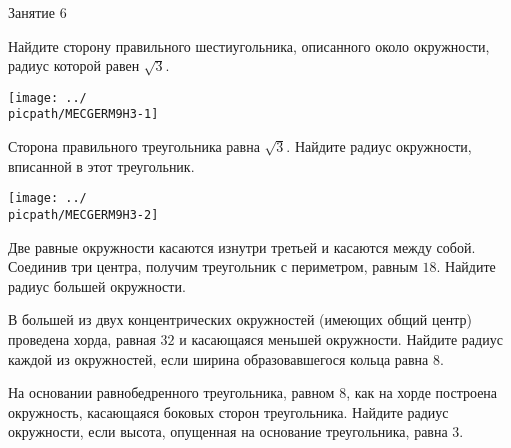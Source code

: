 \begin{class}[number=6]
	\begin{listofex}
		\item Занятие 6
	\end{listofex}
\end{class}

\begin{homework}[number=3]
	\begin{listofex}
		\item
		\begin{minipage}[t]{\bodywidth}
			Найдите сторону правильного шестиугольника, описанного около окружности, радиус которой равен \(\sqrt{3}\).
		\end{minipage}
		\hspace{0.02\linewidth}
		\begin{minipage}[t]{\picwidth}
			\texttt{[image: ../\\picpath/MECGERM9H3-1]}
		\end{minipage}
		\item
		\begin{minipage}[t]{\bodywidth}
			Сторона правильного треугольника равна \(\sqrt{3}\). Найдите радиус окружности, вписанной в этот треугольник.
		\end{minipage}
		\hspace{0.02\linewidth}
		\begin{minipage}[t]{\picwidth}
			\texttt{[image: ../\\picpath/MECGERM9H3-2]}
		\end{minipage}
		\item Две равные окружности касаются изнутри третьей и касаются
		между собой. Соединив три центра, получим треугольник с периметром, равным \(18\). Найдите радиус большей окружности.
		\item В большей из двух концентрических окружностей (имеющих общий центр) проведена хорда, равная \(32\) и касающаяся меньшей окружности. Найдите радиус каждой из окружностей, если ширина образовавшегося кольца равна \(8\).
		\item На основании равнобедренного треугольника, равном \(8\), как на хорде построена окружность, касающаяся боковых сторон треугольника. Найдите радиус окружности, если высота, опущенная на основание треугольника, равна \(3\).
	\end{listofex}
\end{homework}

